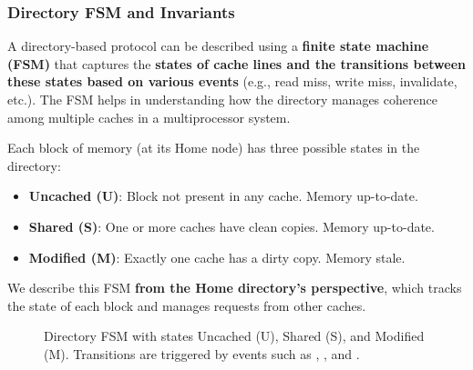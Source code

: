 \subsubsection{Directory FSM and Invariants}

A directory-based protocol can be described using a \textbf{finite state machine (FSM)} that captures the \textbf{states of cache lines and the transitions between these states based on various events} (e.g., read miss, write miss, invalidate, etc.). The FSM helps in understanding how the directory manages coherence among multiple caches in a multiprocessor system.

\highspace
Each block of memory (at its Home node) has three possible states in the directory:
\begin{itemize}
    \item \textbf{Uncached (U)}: Block not present in any cache. Memory up-to-date.
    \item \textbf{Shared (S)}: One or more caches have clean copies. Memory up-to-date.
    \item \textbf{Modified (M)}: Exactly one cache has a dirty copy. Memory stale.
\end{itemize}
We describe this FSM \textbf{from the Home directory's perspective}, which tracks the state of each block and manages requests from other caches.

\begin{figure}[!htp]
    \centering
    \caption{Directory FSM with states Uncached (U), Shared (S), and Modified (M). Transitions are triggered by events such as , , and .}
    \label{fig:directory-fsm}
\end{figure}

